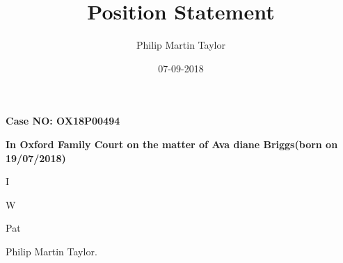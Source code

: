 \documentclass[12pt,a4paper]{book}
\date{07-09-2018}
\author{Philip Martin Taylor}
\title{Position Statement}
\begin{document}
 
\begin{flushright} 
  \textbf{Case NO: OX18P00494}
\end{flushright}
\begin{flushright}
  \textbf{In Oxford Family Court on the matter of Ava diane Briggs(born on 19/07/2018)}
\end{flushright} 
\begin{flushleft}
  
\end{flushleft} 
\begin{flushleft}
  I
\end{flushleft} 
\begin{flushleft}
 W
\end{flushleft} 
\begin{flushleft}
  Pat
\end{flushleft} 
\begin{center}
  Philip Martin Taylor. 
\end{center}
\end{document}
